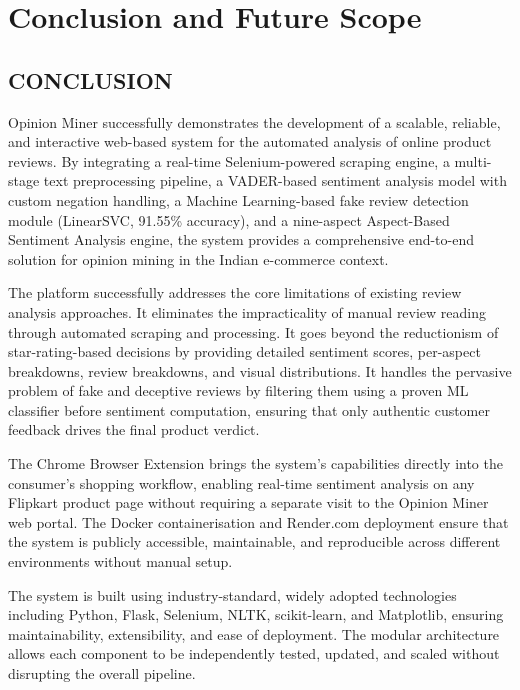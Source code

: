 \documentclass[12pt,a4paper]{report}
\begin{document}
\chapter{Conclusion and Future Scope}

\section{CONCLUSION}

Opinion Miner successfully demonstrates the development of a scalable, reliable, and interactive web-based system for the automated analysis of online product reviews. By integrating a real-time Selenium-powered scraping engine, a multi-stage text preprocessing pipeline, a VADER-based sentiment analysis model with custom negation handling, a Machine Learning-based fake review detection module (LinearSVC, 91.55\% accuracy), and a nine-aspect Aspect-Based Sentiment Analysis engine, the system provides a comprehensive end-to-end solution for opinion mining in the Indian e-commerce context.

The platform successfully addresses the core limitations of existing review analysis approaches. It eliminates the impracticality of manual review reading through automated scraping and processing. It goes beyond the reductionism of star-rating-based decisions by providing detailed sentiment scores, per-aspect breakdowns, review breakdowns, and visual distributions. It handles the pervasive problem of fake and deceptive reviews by filtering them using a proven ML classifier before sentiment computation, ensuring that only authentic customer feedback drives the final product verdict.

The Chrome Browser Extension brings the system's capabilities directly into the consumer's shopping workflow, enabling real-time sentiment analysis on any Flipkart product page without requiring a separate visit to the Opinion Miner web portal. The Docker containerisation and Render.com deployment ensure that the system is publicly accessible, maintainable, and reproducible across different environments without manual setup.

The system is built using industry-standard, widely adopted technologies including Python, Flask, Selenium, NLTK, scikit-learn, and Matplotlib, ensuring maintainability, extensibility, and ease of deployment. The modular architecture allows each component to be independently tested, updated, and scaled without disrupting the overall pipeline.
\end{document}

